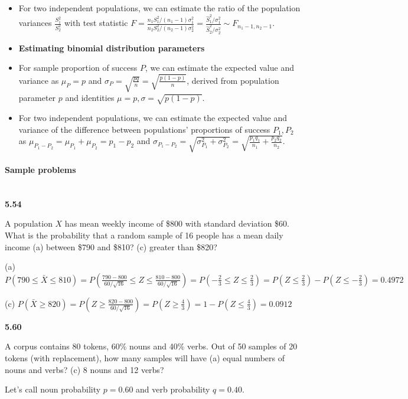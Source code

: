 \documentclass[11pt,letterpaper]{scrartcl}
\begin{document}
\begin{itemize}
\item For two independent populations, we can estimate the ratio of the population variances $\frac{S_{1}^{2}}{S_{2}^{2}}$ with test statistic $F=\frac{n_{1}S_{1}^{2}/(n_{1}-1)\sigma_{1}^{2}}{n_{2}S_{2}^{2}/(n_{2}-1)\sigma_{2}^{2}} = \frac{\hat{S}_{1}^{2} / \sigma_{1}^{2}}{\hat{S}_{2}^{2} / \sigma_{2}^{2}} \sim F_{n_{1}-1, n_{2}-1}$.
\item \textbf{Estimating binomial distribution parameters}
\item For sample proportion of success $P$, we can estimate the expected value and variance as $\mu_{P} = p$ and $\sigma_{P} = \sqrt{\frac{pq}{n}} = \sqrt{\frac{p(1-p)}{n}}$, derived from population parameter $p$ and identities $\mu=p, \sigma=\sqrt{p(1-p)}$.
\item For two independent populations, we can estimate the expected value and variance of the difference between populations' proportions of success $P_{1}, P_{2}$ as $\mu_{P_{1}-P_{2}} = \mu_{P_{1}} + \mu_{P_{2}} = p_{1} - p_{2}$ and $\sigma_{P_{1}-P_{2}} = \sqrt{\sigma^{2}_{P_{1}} + \sigma^{2}_{P_{2}}} = \sqrt{ \frac{p_{1}q_{1}}{n_{1}} + \frac{p_{2}q_{2}}{n_{2}} }$.
\end{itemize}

\paragraph{Sample problems} ~\\

\textbf{5.54}

A population $X$ has mean weekly income of \$800 with standard deviation \$60. What is the probability that a random sample of 16 people has a mean daily income (a) between \$790 and \$810? (c) greater than \$820?

(a) $P(790 \leq \bar{X} \leq 810) = P(\frac{790 - 800}{60 / \sqrt{16}} \leq Z \leq \frac{810 - 800}{60 / \sqrt{16}}) = P(-\frac{2}{3} \leq Z \leq \frac{2}{3}) = P(Z \leq \frac{2}{3}) - P(Z \leq -\frac{2}{3}) = 0.4972$

(c) $P(\bar{X} \geq 820) = P(Z \geq \frac{820 - 800}{60 / \sqrt{16}}) = P(Z \geq \frac{4}{3}) = 1 - P(Z \leq \frac{4}{3}) = 0.0912$

\textbf{5.60}

A corpus contains 80 tokens, 60\% nouns and 40\% verbs. Out of 50 samples of 20 tokens (with replacement), how many samples will have (a) equal numbers of nouns and verbs? (c) 8 nouns and 12 verbs?

Let's call noun probability $p=0.60$ and verb probability $q=0.40$.
\end{document}
